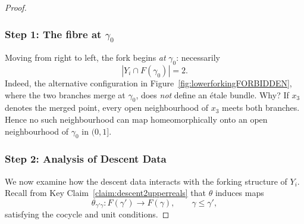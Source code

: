 \documentclass[a4paper, 11pt,reqno]{amsart}
\newcommand{\baseS}{\mathcal{S}}
\newcommand{\MING}[1]{{\color{blue} {\tiny \bf (M:)} {\bf #1}}}
\begin{document}
\begin{proof}
	\subsubsection*{Step 1: The fibre at $\gamma_0$} Moving from right to left, the fork begins \emph{at} $\gamma_0$: necessarily
	\[
	|Y_i\cap F(\gamma_0)|=2.
	\]
	Indeed, the alternative configuration in
	Figure~\ref{fig:lowerforkingFORBIDDEN}, where the two branches merge
	at $\gamma_0$, does {\em not} define an étale bundle. Why? If $x_3$ denotes the
	merged point, every open neighbourhood of $x_3$ meets both branches.
	Hence no such neighbourhood can map homeomorphically onto an open
	neighbourhood of $\gamma_0$ in $(0,1]$. 
	

	
	
	\subsubsection*{Step 2: Analysis of Descent Data} We now examine how the descent data interacts with the forking
	structure of $Y_i$. Recall from Key Claim~\ref{claim:descent2upperreals}
	that $\theta$ induces maps
	\[
	\theta_{\gamma'\gamma}\colon F(\gamma')\longrightarrow F(\gamma),
	\qquad \gamma\leq\gamma',
	\]
	satisfying the cocycle and unit conditions.
	

\end{proof}
\end{document}
